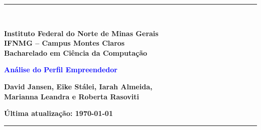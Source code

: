 \documentclass[12pt, twoside, openany]{report}
\begin{document}
\thispagestyle{empty}

\noindent 
\rule{\textwidth}{1ex}\\

\begin{center}
\Large \textbf{Instituto Federal do Norte de Minas Gerais \\ IFNMG -- Campus Montes Claros \\}
\textbf{Bacharelado em Ciência da Computação}

\vspace{1cm}
\Huge {\textcolor{blue}{\textbf{Análise do Perfil Empreendedor}}}

\vfill

\Large \textbf{David Jansen, Eike Stálei, Iarah Almeida, \\ Marianna Leandra e Roberta Rasoviti}
\vfill

\Large \textbf{Última atualização: \today}
\end{center}

 \noindent 
 \rule{\textwidth}{1ex}\\[1ex]

\newpage {} 
\tableofcontents

\newpage {} \pagestyle{headings} 











%
\end{document}
